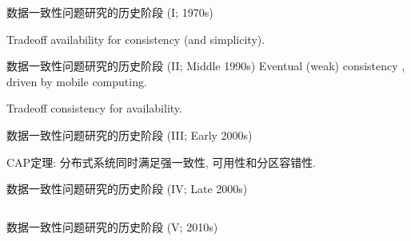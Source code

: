 \begin{frame}{数据一致性问题研究的历史阶段 (I; 1970s)}

  \begin{center}
	Tradeoff availability for consistency {\scriptsize (and simplicity)}.
  \end{center}
\end{frame}
\begin{frame}{数据一致性问题研究的历史阶段 (II; Middle 1990s)}
  Eventual {\scriptsize (weak)} consistency ,  driven by mobile computing.
  

  \begin{center}
	Tradeoff consistency for availability.
  \end{center}
\end{frame}
\begin{frame}{数据一致性问题研究的历史阶段 (III; Early 2000s)}

  CAP定理: 分布式系统同时满足强一致性, 可用性和分区容错性.
   
\end{frame}
\begin{frame}{数据一致性问题研究的历史阶段 (IV; Late 2000s)}

  \begin{columns}
  \end{columns}
\end{frame}
\begin{frame}{数据一致性问题研究的历史阶段 (V; 2010s)}
\end{frame}
